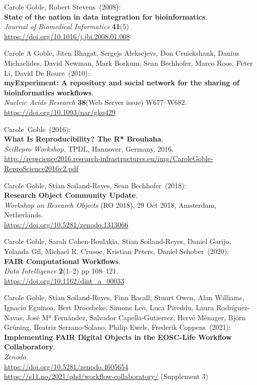 \begin{thebibliography}{9}
Carole Goble, Robert Stevens~(2008): \\
\textbf{State of the nation in data integration for bioinformatics}.\\
\emph{Journal of Biomedical Informatics} \textbf{41}(5) \\
\url{https://doi.org/10.1016/j.jbi.2008.01.008}

Carole A Goble, Jiten Bhagat, Sergejs Aleksejevs, Don
Cruickshank, Danius Michaelides, David Newman, Mark Borkum, Sean
Bechhofer, Marco Roos, Peter Li, David De Roure~(2010): \\
\textbf{myExperiment: A repository and social network for the sharing of bioinformatics workflows}.\\
\emph{Nucleic Acids Research} \textbf{38}(Web Server issue)
W677--W682.\\
\url{https://doi.org/10.1093/nar/gkq429}

Carole~Goble~(2016): \\
\textbf{What Is Reproducibility? The R* Brouhaha}.\\
\emph{SciRepro Workshop}, TPDL, Hannover, Germany, 2016.\\
\url{http://repscience2016.research-infrastructures.eu/img/CaroleGoble-ReproScience2016v2.pdf}

Carole Goble, Stian Soiland-Reyes, Sean Bechhofer~(2018): \\
\textbf{Research Object Community Update}.\\
\emph{Workshop on Research Objects} (RO 2018), 29 Oct 2018, Amsterdam, Netherlands.\\
\url{https://doi.org/10.5281/zenodo.1313066}

Carole Goble, Sarah Cohen-Boulakia, Stian Soiland-Reyes, Daniel
Garijo, Yolanda Gil, Michael R. Crusoe, Kristian Peters, Daniel Schober~(2020): \\
\textbf{FAIR Computational Workflows}.\\
\emph{Data Intelligence} \textbf{2}(1--2) pp 108--121.\\
\url{https://doi.org/10.1162/dint_a_00033}

Carole Goble, Stian Soiland-Reyes, Finn Bacall, Stuart
Owen, Alan Williams, Ignacio Eguinoa, Bert Droesbeke, Simone Leo, Luca
Pireddu, Laura Rodríguez-Navas, José Mª Fernández, Salvador
Capella-Gutierrez, Hervé Ménager, Björn Grüning, Beatriz Serrano-Solano,
Philip Ewels, Frederik Coppens~(2021): \\
\textbf{Implementing FAIR Digital Objects in the EOSC-Life Workflow Collaboratory}.\\
\emph{Zenodo}\\
\url{https://doi.org/10.5281/zenodo.4605654}\\
\url{https://s11.no/2021/phd/workflow-collaboratory/} (Supplement 3)


\end{thebibliography}
